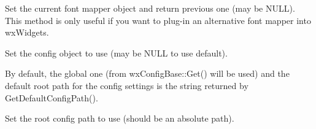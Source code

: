 \label{wxfontmapperset}


Set the current font mapper object and return previous one (may be NULL).
This method is only useful if you want to plug-in an alternative font mapper
into wxWidgets.




\label{wxfontmappersetconfig}


Set the config object to use (may be NULL to use default).

By default, the global one (from wxConfigBase::Get() will be used) 
and the default root path for the config settings is the string returned by
GetDefaultConfigPath().


\label{wxfontmappersetconfigpath}


Set the root config path to use (should be an absolute path).

